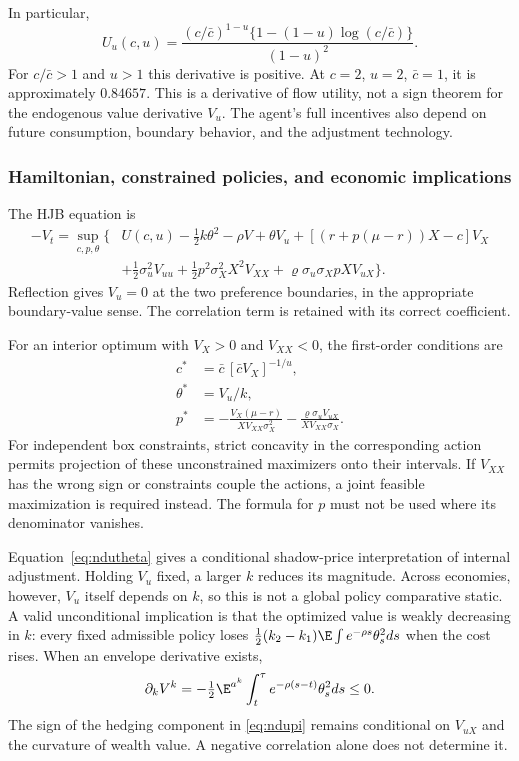 In particular,
\begin{equation}\label{eq:uderivative}
 U_u(c,u)=\frac{(c/\bar c)^{1-u}\{1-(1-u)\log(c/\bar c)\}}{(1-u)^2}.
\end{equation}
For $c/\bar c>1$ and $u>1$ this derivative is positive. At $c=2$, $u=2$, $\bar c=1$, it is approximately $0.84657$. This is a derivative of flow utility, not a sign theorem for the endogenous value derivative $V_u$. The agent's full incentives also depend on future consumption, boundary behavior, and the adjustment technology.

\subsubsection{Hamiltonian, constrained policies, and economic implications}
The HJB equation is
\begin{align}\label{eq:nduhjb}
 -V_t=\sup_{c,p,\theta}\big\{&U(c,u)-\tfrac12 k\theta^2-\rho V
 +\theta V_u+[(r+p(\mu-r))X-c]V_X\nonumber\\
 &+\tfrac12\sigma_u^2V_{uu}+\tfrac12p^2\sigma_X^2X^2V_{XX}
 +\varrho\sigma_u\sigma_X pX V_{uX}\big\}.
\end{align}
Reflection gives $V_u=0$ at the two preference boundaries, in the appropriate boundary-value sense. The correlation term is retained with its correct coefficient.

For an interior optimum with $V_X>0$ and $V_{XX}<0$, the first-order conditions are
\begin{align}
 c^*&=\bar c\,[\bar c V_X]^{-1/u},\label{eq:nduc}\\
 \theta^*&=V_u/k,\label{eq:ndutheta}\\
 p^*&=-\frac{V_X(\mu-r)}{XV_{XX}\sigma_X^2}
       -\frac{\varrho\sigma_u V_{uX}}{XV_{XX}\sigma_X}.\label{eq:ndupi}
\end{align}
For independent box constraints, strict concavity in the corresponding action permits projection of these unconstrained maximizers onto their intervals. If $V_{XX}$ has the wrong sign or constraints couple the actions, a joint feasible maximization is required instead. The formula for $p$ must not be used where its denominator vanishes.

Equation~\eqref{eq:ndutheta} gives a conditional shadow-price interpretation of internal adjustment. Holding $V_u$ fixed, a larger $k$ reduces its magnitude. Across economies, however, $V_u$ itself depends on $k$, so this is not a global policy comparative static. A valid unconditional implication is that the optimized value is weakly decreasing in $k$: every fixed admissible policy loses $\tfrac12(k_2-k_1)\E\int e^{-\rho s}\theta_s^2ds$ when the cost rises. When an envelope derivative exists,
\begin{equation}\label{eq:envelope}
 \partial_k V^k=-\tfrac12\E^{a^k}\int_t^\tau e^{-\rho(s-t)}\theta_s^2ds\leq0.
\end{equation}
The sign of the hedging component in \eqref{eq:ndupi} remains conditional on $V_{uX}$ and the curvature of wealth value. A negative correlation alone does not determine it.

